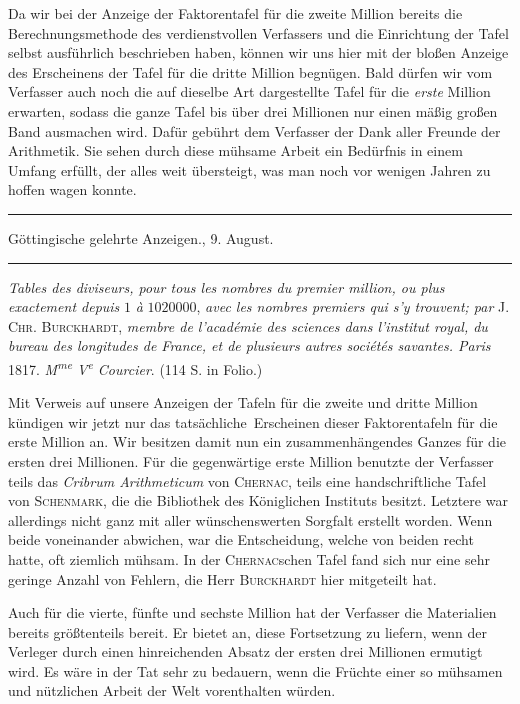Da wir bei der Anzeige der Faktorentafel für die zweite Million bereits die Berechnungsmethode des verdienstvollen Verfassers und die Einrichtung der Tafel selbst ausführlich beschrieben haben, können wir uns hier mit der bloßen Anzeige des Erscheinens der Tafel für die dritte Million begnügen. Bald dürfen wir vom Verfasser auch noch die auf dieselbe Art dargestellte Tafel für die \emph{erste} Million erwarten, sodass die ganze Tafel bis über drei Millionen nur einen mäßig großen Band ausmachen wird. Dafür gebührt dem Verfasser der Dank aller Freunde der Arithmetik. Sie sehen durch diese mühsame Arbeit ein Bedürfnis in einem Umfang erfüllt, der alles weit übersteigt, was man noch vor wenigen Jahren zu hoffen wagen konnte.

\begin{center}
\rule{.86\linewidth}{.3pt}\par
Göttingische gelehrte Anzeigen., 9. August.\par
\rule{.86\linewidth}{.3pt}
\end{center}
\emph{Tables des diviseurs, pour tous les nombres du premier million, ou plus exactement depuis} $1$ \emph{à} $1020000$, \emph{avec les nombres premiers qui s'y trouvent; par} \textsc{J. Chr. Burckhardt}, \emph{membre de l'académie des sciences dans l'institut royal, du bureau des longitudes de France, et de plusieurs autres sociétés savantes. Paris} 1817. \emph{M\textsuperscript{me} V\textsuperscript{e} Courcier}. (114 S. in Folio.)

Mit Verweis auf unsere Anzeigen der Tafeln für die zweite und dritte Million kündigen wir jetzt nur das tatsächliche\textperiodcentered\ Erscheinen dieser Faktorentafeln für die erste Million an. Wir besitzen damit nun ein zusammenhängendes Ganzes für die ersten drei Millionen. Für die gegenwärtige erste Million benutzte der Verfasser teils das \emph{Cribrum Arithmeticum} von \textsc{Chernac}, teils eine handschriftliche Tafel von \textsc{Schenmark}, die die Bibliothek des Königlichen Instituts besitzt. Letztere war allerdings nicht ganz mit aller wünschenswerten Sorgfalt erstellt worden. Wenn beide voneinander abwichen, war die Entscheidung, welche von beiden recht hatte, oft ziemlich mühsam. In der \textsc{Chernac}schen Tafel fand sich nur eine sehr geringe Anzahl von Fehlern, die Herr \textsc{Burckhardt} hier mitgeteilt hat.

Auch für die vierte, fünfte und sechste Million hat der Verfasser die Materialien bereits größtenteils bereit. Er bietet an, diese Fortsetzung zu liefern, wenn der Verleger durch einen hinreichenden Absatz der ersten drei Millionen ermutigt wird. Es wäre in der Tat sehr zu bedauern, wenn die Früchte einer so mühsamen und nützlichen Arbeit der Welt vorenthalten würden.
\endgroup
